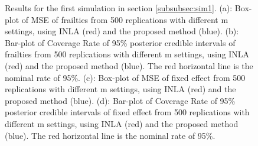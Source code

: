\documentclass[ba]{imsart}
\begin{document}
\begin{figure}[p]
\centering
{}
\caption{Results for the first simulation in section \ref{subsubsec:sim1}. (a): Box-plot of MSE of frailties from 500 replications with different m settings, using INLA (red) and the proposed method (blue). (b): Bar-plot of Coverage Rate of 95\% posterior credible intervals of frailties from 500 replications with different m settings, using INLA (red) and the proposed method (blue). The red horizontal line is the nominal rate of 95\%. (c): Box-plot of MSE of fixed effect from 500 replications with different m settings, using INLA (red) and the proposed method (blue). (d): Bar-plot of Coverage Rate of 95\% posterior credible intervals of fixed effect from 500 replications with different m settings, using INLA (red) and the proposed method (blue). The red horizontal line is the nominal rate of 95\%.  }
\label{fig:Sim1Plot}
\end{figure}
\end{document}
